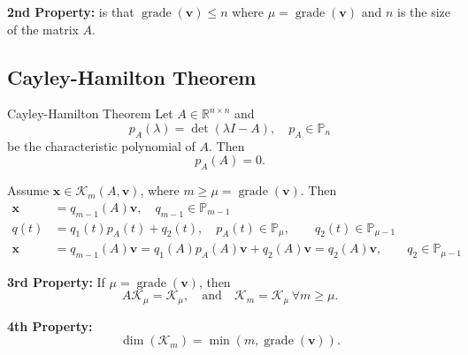 \textbf{2nd Property:}
is that $\operatorname{grade}(\mathbf{v}) \leq n$ where $\mu = \operatorname{grade}(\mathbf{v})$ and $n$ is the size of the matrix $A$.

\subsection{Cayley-Hamilton Theorem}
\begin{theorem}{Cayley-Hamilton Theorem}{}
    Let $A \in \mathbb{R}^{n \times n}$ and
    \[
        p_A(\lambda) = \det(\lambda I - A), \quad p_A \in \mathbb{P}_n
    \]
    be the characteristic polynomial of $A$. Then
    \[
        p_A(A) = 0.
    \]
\end{theorem}

Assume $\mathbf{x} \in \mathcal{K}_m(A, \mathbf{v})$, where $m \geq \mu = \operatorname{grade}(\mathbf{v})$. Then
\begin{align*}
    \mathbf{x} & = q_{m-1}(A)\mathbf{v}, \quad q_{m-1} \in \mathbb{P}_{m-1}                                                                   \\
    q(t)       & = q_1(t) p_A(t) + q_2(t), \quad p_A(t) \in \mathbb{P}_{\mu}, \qquad q_2(t) \in \mathbb{P}_{\mu-1}                            \\
    \mathbf{x} & = q_{m-1}(A)\mathbf{v} = q_1(A) p_A(A) \mathbf{v} + q_2(A) \mathbf{v} = q_2(A) \mathbf{v}, \qquad q_2 \in \mathbb{P}_{\mu-1}
\end{align*}

\textbf{3rd Property:}
If $\mu = \operatorname{grade}(\mathbf{v})$, then
\[
    A\mathcal{K}_\mu = \mathcal{K}_\mu, \quad \text{and} \quad \mathcal{K}_m = \mathcal{K}_\mu \, \forall m \geq \mu.
\]

\textbf{4th Property:}
\[
    \dim(\mathcal{K}_m) = \min(m, \operatorname{grade}(\mathbf{v})).
\]

